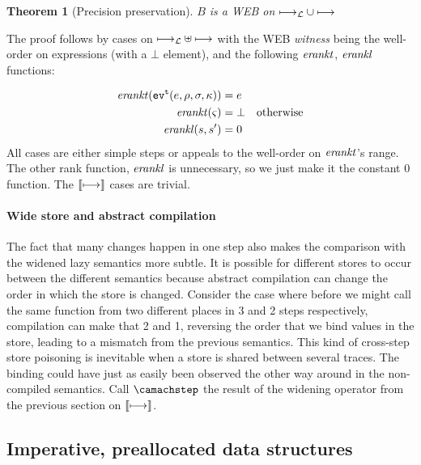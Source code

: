 \documentclass[preprint,onecolumn,9pt]{sigplanconf} %
\newtheorem{theorem}{Theorem}
\begin{document}
\begin{theorem}[Precision preservation]
$B$ is a WEB on $\lmachstep \cup \machstep$
\end{theorem}

The proof follows by cases on $\lmachstep \uplus \machstep$ with the
WEB \emph{witness} being the well-order on expressions (with a $\bot$
element), and the following $\erankt$, $\erankl$ functions:

\begin{align*}
\erankt(\ev[^\mcntr]{\mexp,\menv,\msto,\mkont}) &= \mexp \\
\erankt(\mstate) &= \bot \quad \text{otherwise} \\
\erankl(s,s') &= 0
\end{align*}
All cases are either simple steps or appeals to the well-order on $\erankt$'s range. The other rank function,
$\erankl$ is unnecessary, so we just make it the constant 0
function. The $\cmachstep$ cases are trivial.

\paragraph{Wide store and abstract compilation}
The fact that many changes happen in one step also makes the
comparison with the widened lazy semantics more subtle. It is possible
for different stores to occur between the different semantics because
abstract compilation can change the order in which the store is
changed. Consider the case where before we might call the same
function from two different places in 3 and 2 steps respectively,
compilation can make that 2 and 1, reversing the order that we bind
values in the store, leading to a mismatch from the previous
semantics. This kind of cross-step store poisoning is inevitable when
a store is shared between several traces. The binding could have just
as easily been observed the other way around in the non-compiled
semantics. Call $\camachstep$ the result of the widening operator from
the previous section on $\cmachstep$.





\subsection{Imperative, preallocated data structures}
\end{document}
